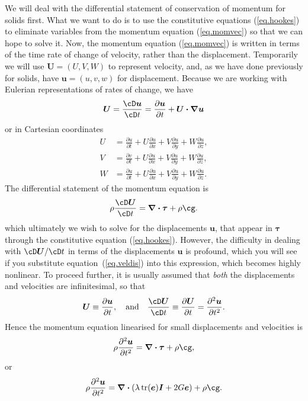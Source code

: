 \documentclass[twoside,11pt]		{report}
\begin{document}
We will deal with the differential statement of conservation of
momentum for solids first. What we want to do is to use the
constitutive equations (\ref{eq.hookes}) to eliminate variables from
the momentum equation (\ref{eq.momvec}) so that we can hope to solve
it. Now, the momentum equation (\ref{eq.momvec}) is written in terms
of the time rate of change of velocity, rather than the
displacement. Temporarily we will use $\bm{U}=(U,V,W)$ to represent
velocity, and, as we have done previously for solids, have
$\bm{u}=(u,v,w)$ for displacement. Because we are working with
Eulerian representations of rates of change, we have
\begin{equation}
\bm{U}=\frac{\cD\bm{u}}{\cD t}=
\frac{\partial\bm{u}}{\partial t} + \bm{U\cdot\nabla u}
\label{eq.veldis}
\end{equation}
or in Cartesian coordinates
\begin{align}
U & = \frac{\partial u}{\partial t} +
 U\frac{\partial u}{\partial x} +
 V\frac{\partial u}{\partial y} +
 W\frac{\partial u}{\partial z}, \\
V & = \frac{\partial v}{\partial t} +
 U\frac{\partial u}{\partial x} +
 V\frac{\partial u}{\partial y} +
 W\frac{\partial u}{\partial z}, \\
W & = \frac{\partial u}{\partial t} +
 U\frac{\partial u}{\partial x} +
 V\frac{\partial u}{\partial y} +
 W\frac{\partial u}{\partial z}.
\end{align}
The differential statement of the momentum equation is
\begin{equation}
\rho\frac{\cD \bm{U}}{\cD t}=\bm{\nabla\cdot\tau} + \rho\bm{\cg}.
\end{equation}
which ultimately we wish to solve for the displacements $\bm{u}$, that
appear in $\bm{\tau}$ through the constitutive equation
(\ref{eq.hookes}). However, the difficulty in dealing with
$\cD\bm{U}/\cD t$ in terms of the displacements $\bm{u}$ is profound,
which you will see if you substitute equation~(\ref{eq.veldis}) into
this expression, which becomes highly nonlinear. To proceed further,
it is usually assumed that \emph{both} the displacements and
velocities are infinitesimal, so that
\[
\bm{U} \equiv \frac{\partial \bm{u}}{\partial t}, \quad\textrm{and}\quad
\frac{\cD \bm{U}}{\cD t}\equiv\frac{\partial\bm{U}}{\partial t}=
\frac{\partial^2 \bm{u}}{\partial t^2}.
\]
Hence the momentum equation linearised for small displacements and
velocities is
\begin{equation}
\rho\frac{\partial^2 \bm{u}}{\partial t^2}=\bm{\nabla\cdot\tau} + \rho\bm{\cg},
\end{equation}
or 
\begin{equation}
\rho\frac{\partial^2 \bm{u}}{\partial t^2}=
\bm{\nabla\cdot}\left(\lambda\,\mathrm{tr}(\bm{e})\bm{I} + 2 G\bm{e}\right) +
\rho\bm{\cg}.
\end{equation}
\end{document}
